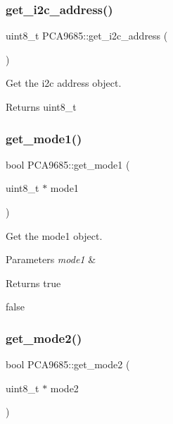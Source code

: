 \subsubsection{\texorpdfstring{get\+\_\+i2c\+\_\+address()}{get\_i2c\_address()}}
{\footnotesize\ttfamily uint8\+\_\+t P\+C\+A9685\+::get\+\_\+i2c\+\_\+address (\begin{DoxyParamCaption}{ }\end{DoxyParamCaption})}



Get the i2c address object. 

\begin{DoxyReturn}{Returns}
uint8\+\_\+t 
\end{DoxyReturn}
\mbox{\label{class_p_c_a9685_a891336e03b217b1ec555069dde646b7b}} 
\subsubsection{\texorpdfstring{get\+\_\+mode1()}{get\_mode1()}}
{\footnotesize\ttfamily bool P\+C\+A9685\+::get\+\_\+mode1 (\begin{DoxyParamCaption}\item[{uint8\+\_\+t $\ast$}]{mode1 }\end{DoxyParamCaption})}



Get the mode1 object. 


\begin{DoxyParams}{Parameters}
{\em mode1} & \\
\hline
\end{DoxyParams}
\begin{DoxyReturn}{Returns}
true 

false 
\end{DoxyReturn}
\mbox{\label{class_p_c_a9685_a36ccfb59d66ed69bb5bbdff2e4abb92f}} 
\subsubsection{\texorpdfstring{get\+\_\+mode2()}{get\_mode2()}}
{\footnotesize\ttfamily bool P\+C\+A9685\+::get\+\_\+mode2 (\begin{DoxyParamCaption}\item[{uint8\+\_\+t $\ast$}]{mode2 }\end{DoxyParamCaption})}



